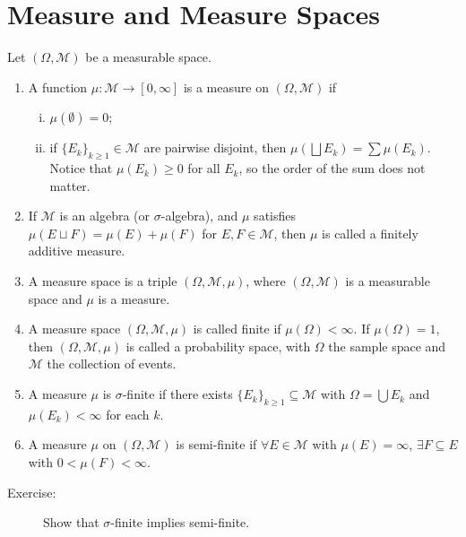 \documentclass[10pt]{extarticle}
\begin{document}
  \section{Measure and Measure Spaces}%
  Let $(\Omega,\mathcal{M})$ be a measurable space.
  \begin{enumerate}[(1)]
    \item A function $\mu: \mathcal{M}\rightarrow [0,\infty]$ is a measure on $(\Omega,\mathcal{M})$ if
      \begin{enumerate}[(i)]
        \item $\mu(\emptyset) = 0$;
        \item if $\{E_k\}_{k\geq 1}\in \mathcal{M}$ are pairwise disjoint, then $\mu \left(\bigsqcup E_k\right) = \sum \mu(E_k)$. Notice that $\mu(E_k)\geq 0$ for all $E_k$, so the order of the sum does not matter.
      \end{enumerate}
    \item If $\mathcal{M}$ is an algebra (or $\sigma$-algebra), and $\mu$ satisfies $\mu(E\sqcup F) = \mu(E) + \mu(F)$ for $E,F\in \mathcal{M}$, then $\mu$ is called a finitely additive measure.
    \item A measure space is a triple $(\Omega,\mathcal{M},\mu)$, where $(\Omega,\mathcal{M})$ is a measurable space and $\mu$ is a measure.
    \item A measure space $(\Omega,\mathcal{M},\mu)$ is called finite if $\mu(\Omega) < \infty$. If $\mu(\Omega) = 1$, then $(\Omega,\mathcal{M},\mu)$ is called a probability space, with $\Omega$ the sample space and $\mathcal{M}$ the collection of events.
    \item A measure $\mu$ is $\sigma$-finite if there exists $\{E_k\}_{k\geq 1}\subseteq \mathcal{M}$ with $\Omega = \bigcup E_k$ and $\mu(E_k) < \infty$ for each $k$.
    \item A measure $\mu$ on $(\Omega,\mathcal{M})$ is semi-finite if $\forall E\in \mathcal{M}$ with $\mu(E) = \infty$, $\exists F\subseteq E$ with $0 < \mu(F) < \infty$.
  \end{enumerate}
  \begin{description}
    \item[Exercise:] Show that $\sigma$-finite implies semi-finite.
  \end{description}
\end{document}
